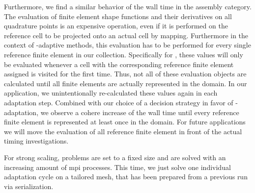 Furthermore, we find a similar behavior of the wall time in the assembly category.
The evaluation of finite element shape functions and their derivatives on all quadrature points is an expensive operation, even if it is performed on the reference cell to be projected onto an actual cell by mapping. Furthermore in the context of \hp-adaptive methods, this evaluation has to be performed for every single reference finite element in our collection.
Specifically for \dealii{}, these values will only be evaluated whenever a cell with the corresponding reference finite element assigned is visited for the first time. Thus, not all of these evaluation objects are calculated until all finite elements are actually represented in the domain.
In our application, we unintentionally re-calculated these values again in each adaptation step. Combined with our choice of a decision strategy in favor of \p-adaptation, we observe a cohere increase of the wall time until every reference finite element is represented at least once in the domain. For future applications we will move the evaluation of all reference finite element in front of the actual timing investigations.



For strong scaling, problems are set to a fixed size and are solved with an increasing amount of \gls{mpi} processes. This time, we just solve one individual adaptation cycle on a tailored mesh, that has been prepared from a previous run via serialization.

